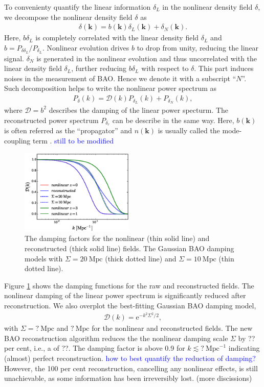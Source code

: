 \documentclass[aps,prd,twocolumn,showpacs,superscriptaddress,groupedaddress,nofootinbib]{revtex4}  %
\newcommand{\mr}{\mathrm}
\newcommand{\tcb}{\textcolor{blue}}
\newcommand{\bea}{\begin{eqnarray}}
\newcommand{\eea}{\end{eqnarray}}
\begin{document}
To convenienty quantify the linear information $\delta_L$ in 
the nonlinear density field $\delta$, we decompose the nonlinear density field
$\delta$ as
\begin{eqnarray}
\delta(\bm{k})=b(\bm{k})\delta_L(\bm{k})+\delta_N(\bm{k}).
\end{eqnarray}
Here, $b\delta_L$ is completely correlated with the linear density field 
$\delta_L$ and $b=P_{\delta\delta_L}/P_{\delta_L}$.
Nonlinear evolution drives $b$ to drop from unity, reducing the linear signal.
$\delta_N$ is generated in the nonlinear evolution and thus uncorrelated with
the linear density field $\delta_L$, further reducing $b\delta_L$ with respect
to $\delta$. This part induces noises in the measurement of BAO. 
Hence we denote it with a subscript ``$N$''. 
Such decomposition helps to write the nonlinear power spectrum as
\bea
P_\delta(k)=\mathcal{D}(k)P_{\delta_L}(k)+P_{\delta_N}(k),
\eea
where $\mathcal{D}=b^2$ describes the damping of the linear power specturm.
The reconstructed power spectrum $P_{\delta_r}$ can be describe in the same way.
Here, $b(\bm{k})$ is often referred as the ``propagator'' 
and $n(\bm{k})$ is usually
called the mode-coupling term \cite{2006crocce,2008crocce,2008matsubara}.
\tcb{still to be modified}

\begin{figure}[tbp]
\begin{center}
\includegraphics[width=0.48\textwidth]{f6x.eps}
\end{center}
\vspace{-0.7cm}
\caption{The damping factors for the nonlinear (thin solid line) and 
reconstructed (thick solid line) fields. The Gaussian BAO damping models with 
$\Sigma=20\ \mr{Mpc}$ (thick dotted line) and $\Sigma=10\ \mr{Mpc}$ (thin dotted
line).}
\label{fig:damp}
\end{figure}

Figure \ref{fig:damp} shows the damping functions for the raw and reconstructed 
fields. The nonlinear damping of the linear power spectrum is 
significantly reduced after reconstruction. We also overplot the best-fitting 
Gaussian BAO damping model,
\bea
\mathcal{D}(k)=\mr{e}^{-k^2\Sigma^2/2},
\eea
with $\Sigma=?\ \mr{Mpc}$ and $?\ \mr{Mpc}$ for the nonlinear and reconstructed 
fields. The new BAO reconstruction algorithm reduces the the nonlinear damping
scale $\Sigma$ by ?? per cent, i.e., a of ??. The damping factor is above 0.9
for $k\lesssim?\ \mr{Mpc}^{-1}$ indicating (almost) perfect reconstruction. 
\tcb{how to best quantify the reduction of damping? }
However, the 100 per cent reconstruction, cancelling any nonlinear effects,
is still unachievable, as some information has been irreversibly lost. (more 
discissions)
\end{document}
